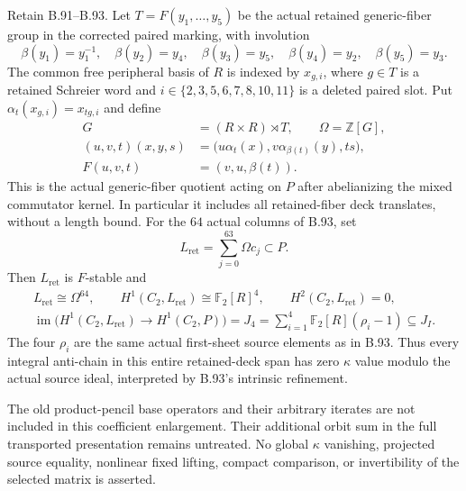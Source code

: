\label{stmt:B94}
Retain B.91--B.93. Let $T=F(y_1,\ldots,y_5)$ be the actual retained
generic-fiber group in the corrected paired marking, with involution
\begin{equation}\label{eq:B94-beta}
 \beta(y_1)=y_1^{-1},\quad
 \beta(y_2)=y_4,\quad\beta(y_3)=y_5,\quad
 \beta(y_4)=y_2,\quad\beta(y_5)=y_3.
\end{equation}
The common free peripheral basis of $R$ is indexed by
$x_{g,i}$, where $g\in T$ is a retained Schreier word and
$i\in\{2,3,5,6,7,8,10,11\}$ is a deleted paired slot.
Put $\alpha_t(x_{g,i})=x_{tg,i}$ and define
\begin{equation}\label{eq:B94-G}
 \begin{aligned}
 G&=(R\times R)\rtimes T,\qquad \Omega=\mathbb Z[G],\\
 (u,v,t)(x,y,s)&=
       \bigl(u\alpha_t(x),v\alpha_{\beta(t)}(y),ts\bigr),\\
 F(u,v,t)&=(v,u,\beta(t)).
 \end{aligned}
\end{equation}
This is the actual generic-fiber quotient acting on $P$ after
abelianizing the mixed commutator kernel. In particular it includes
all retained-fiber deck translates, without a length bound.
For the $64$ actual columns of B.93, set
\[
                 L_{\mathrm{ret}}=\sum_{j=0}^{63}\Omega c_j\subset P.
\]
Then $L_{\mathrm{ret}}$ is $F$-stable and
\begin{equation}\label{eq:B94-result}
 \begin{gathered}
 L_{\mathrm{ret}}\cong\Omega^{64},\qquad
 H^1(C_2,L_{\mathrm{ret}})\cong\mathbb F_2[R]^4,
 \qquad H^2(C_2,L_{\mathrm{ret}})=0,\\
 \operatorname{im}\bigl(H^1(C_2,L_{\mathrm{ret}})
                  \longrightarrow H^1(C_2,P)\bigr)
       =J_4=\sum_{i=1}^4\mathbb F_2[R](\rho_i-1)\subseteq J_I.
 \end{gathered}
\end{equation}
The four $\rho_i$ are the same actual first-sheet source elements
as in B.93. Thus every integral anti-chain in this entire
retained-deck span has zero $\kappa$ value modulo the actual
source ideal, interpreted by B.93's intrinsic refinement.

The old product-pencil base operators and their arbitrary iterates
are not included in this coefficient enlargement. Their additional
orbit sum in the full transported presentation remains untreated.
No global $\kappa$ vanishing, projected source equality, nonlinear
fixed lifting, compact comparison, or invertibility of the selected
matrix is asserted.

